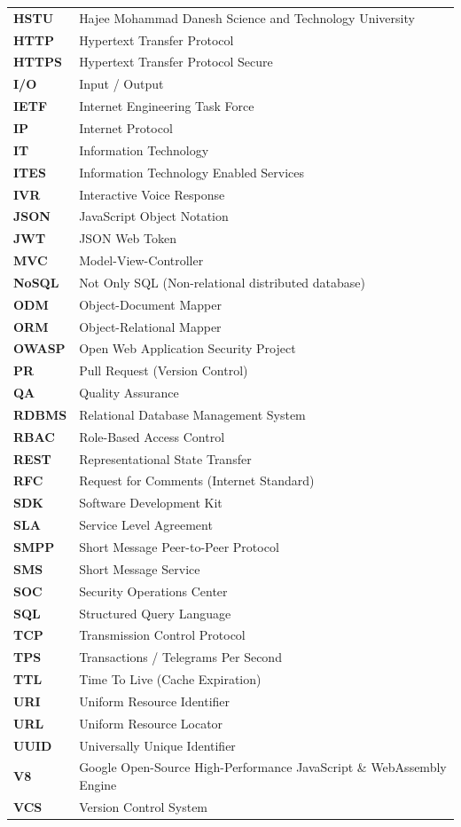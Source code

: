 \begin{singlespace}
\begin{longtable}{ll}
\textbf{HSTU} & Hajee Mohammad Danesh Science and Technology University \\
\textbf{HTTP} & Hypertext Transfer Protocol \\
\textbf{HTTPS} & Hypertext Transfer Protocol Secure \\
\textbf{I/O} & Input / Output \\
\textbf{IETF} & Internet Engineering Task Force \\
\textbf{IP} & Internet Protocol \\
\textbf{IT} & Information Technology \\
\textbf{ITES} & Information Technology Enabled Services \\
\textbf{IVR} & Interactive Voice Response \\
\textbf{JSON} & JavaScript Object Notation \\
\textbf{JWT} & JSON Web Token \\
\textbf{MVC} & Model-View-Controller \\
\textbf{NoSQL} & Not Only SQL (Non-relational distributed database) \\
\textbf{ODM} & Object-Document Mapper \\
\textbf{ORM} & Object-Relational Mapper \\
\textbf{OWASP} & Open Web Application Security Project \\
\textbf{PR} & Pull Request (Version Control) \\
\textbf{QA} & Quality Assurance \\
\textbf{RDBMS} & Relational Database Management System \\
\textbf{RBAC} & Role-Based Access Control \\
\textbf{REST} & Representational State Transfer \\
\textbf{RFC} & Request for Comments (Internet Standard) \\
\textbf{SDK} & Software Development Kit \\
\textbf{SLA} & Service Level Agreement \\
\textbf{SMPP} & Short Message Peer-to-Peer Protocol \\
\textbf{SMS} & Short Message Service \\
\textbf{SOC} & Security Operations Center \\
\textbf{SQL} & Structured Query Language \\
\textbf{TCP} & Transmission Control Protocol \\
\textbf{TPS} & Transactions / Telegrams Per Second \\
\textbf{TTL} & Time To Live (Cache Expiration) \\
\textbf{URI} & Uniform Resource Identifier \\
\textbf{URL} & Uniform Resource Locator \\
\textbf{UUID} & Universally Unique Identifier \\
\textbf{V8} & Google Open-Source High-Performance JavaScript \& WebAssembly Engine \\
\textbf{VCS} & Version Control System \\
\bottomrule
\end{longtable}
\end{singlespace}
